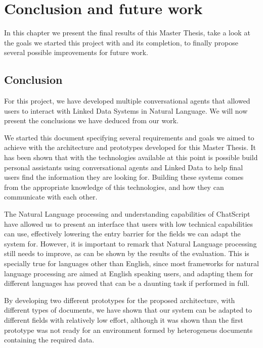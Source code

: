 \chapter{Conclusion and future work}
\label{chap:conclusion}

\begin{chapterintro}

In this chapter we present the final results of this Master Thesis, take a look at the goals we started this project with and its completion, to finally propose several possible improvements for future work.
 
\end{chapterintro}

\cleardoublepage

\section{Conclusion}

For this project, we have developed multiple conversational agents that allowed users to interact with Linked Data Systems in Natural Language. We will now present the conclusions we have deduced from our work.

We started this document specifying several requirements and goals we aimed to achieve with the architecture and prototypes developed for this Master Thesis. It has been shown that with the technologies available at this point is possible build personal assistants using conversational agents and Linked Data to help final users find the information they are looking for. Building these systems comes from the appropriate knowledge of this technologies, and how they can communicate with each other.

The Natural Language processing and understanding capabilities of ChatScript have allowed us to present an interface that users with low technical capabilities can use, effectively lowering the entry barrier for the fields we can adapt the system for. However, it is important to remark that Natural Language processing still needs to improve, as can be shown by the results of the evaluation. This is specially true for languages other than English, since most frameworks for natural language processing are aimed at English speaking users, and adapting them for different languages has proved that can be a daunting task if performed in full.

By developing two different prototypes for the proposed architecture, with different types of documents, we have shown that our system can be adapted to different fields with relatively low effort, although it was shown than the first prototype was not ready for an environment formed by heterogeneus documents containing the required data.


